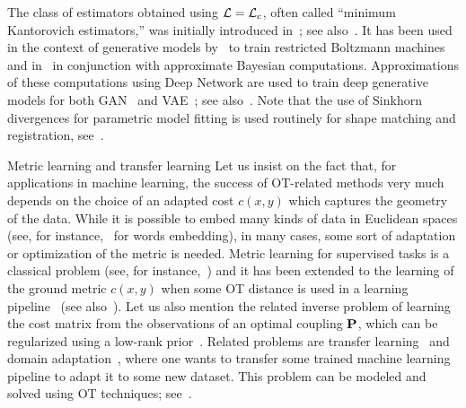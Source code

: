 The class of estimators obtained using $\Ll=\MK_\c$, often called ``minimum Kantorovich estimators,'' was initially introduced in~\citep{bassetti2006minimum}; see also~\citep{CanasRosasco}. It has been used in the context of generative models by~\citep{CuturiBoltzman} to train restricted Boltzmann machines and in~\citep{bernton2017inference} in conjunction with approximate Bayesian computations.  Approximations of these computations using Deep Network are used to train deep generative models for both GAN~\citep{WassersteinGAN} and VAE~\citep{Bousquet2017}; see also~\citep{2017-Genevay-AutoDiff,2017-Genevay-gan-vae,salimans2018improving}. Note that the use of Sinkhorn divergences for parametric model fitting is used routinely for shape matching and registration, see~\citep{gold1998new,chui2000new,myronenko2010point,2017-feydy-miccai}.


\begin{rem1}{Metric learning and transfer learning}
	Let us insist on the fact that, for applications in machine learning, the success of OT-related methods very much depends on the choice of an adapted cost $c(x,y)$ which captures the geometry of the data. 
	While it is possible to embed many kinds of data in Euclidean spaces (see, for instance,~\citep{mikolov2013efficient} for words embedding), in many cases, some sort of adaptation or optimization of the metric is needed. 
	Metric learning for supervised tasks is a classical problem (see, for instance,~\citep{MAL-019,weinberger2009distance}) and it has been extended to the learning of the ground metric $c(x,y)$ when some OT distance is used in a learning pipeline~\citep{CuturiGroundMetric2014} (see also~\citealt{ZenICPR14,WangECCV12OLD,huang2016supervised}).
	Let us also mention the related inverse problem of learning the cost matrix from the observations of an optimal coupling $\P$, which can be regularized using a low-rank prior~\citep{dupuy2016estimating}.
	Related problems are transfer learning~\citep{pan2010survey} and domain adaptation~\citep{glorot2011domain}, where one wants to transfer some trained machine learning pipeline to adapt it to some new dataset. This problem can be modeled and solved using OT techniques; see~\citep{courty2017optimal,courty2017joint}.
\end{rem1}

